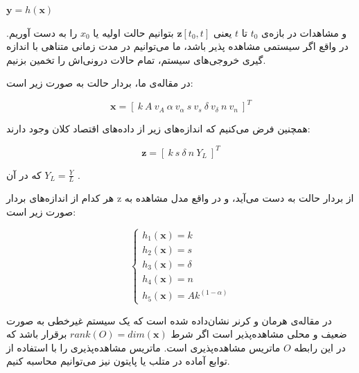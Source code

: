 \documentclass[11pt, fleqn]{article}
\begin{document}
\begin{multicols}{2}
\begin{latin}
$\mathbf{y} = h(\mathbf{x})$
\end{latin}

و مشاهدات در بازه‌ی 
$t_0$
 تا 
 $t$
  یعنی
$\mathbf{z}[t_0, t]$
 بتوانیم حالت اولیه یا 
 $x_0$
 را به دست آوریم. در واقع اگر سیستمی مشاهده‌ پذیر باشد، ما می‌توانیم در مدت زمانی متناهی با اندازه گیری خروجی‌های سیستم، تمام حالات درونی‌اش را تخمین بزنیم.  
 
	در مقاله‌ی ما، بردار حالت به صورت زیر است:

\useshortskip
\begin{LTR}
\begin{equation}
\mathbf{x} = [\ k \ A \ v_A \  \alpha \  v_\alpha \  s \ v_s  \ \delta \  v_\delta \ n \  v_n \ ]^T
\end{equation} 
\end{LTR}

همچنین فرض می‌کنیم که اندازه‌های زیر از داده‌های اقتصاد کلان وجود دارند:

\useshortskip
\begin{LTR}
\begin{equation}
\mathbf{z} = [\ k \ s \ \delta \ n \ Y_L \ ]^T
\end{equation}
\end{LTR}


که در آن 
 $Y_L = \frac{Y}{L}$
  . 

	هر کدام از اندازه‌های بردار z از بردار حالت به دست می‌آید، و در واقع مدل مشاهده به صورت زیر است:

\useshortskip
\begin{LTR}
\begin{equation}
\begin{cases}
h_1(\mathbf{x}) = k \\
 h_2(\mathbf{x}) = s \\
  h_3(\mathbf{x}) = \delta \\
   h_4(\mathbf{x}) = n \\
    h_5(\mathbf{x}) = Ak^{(1-\alpha)} \end{cases}
\end{equation}
\end{LTR}


	در مقاله‌ی هرمان و کرنر 
نشان‌داده شده است که یک سیستم غیرخطی به صورت ضعیف و محلی مشاهده‌پذیر
 است اگر شرط
$rank(O) = dim(\mathbf{x})$
برقرار باشد که در این رابطه
$O$
 ماتریس مشاهده‌پذیری
 است. ماتریس مشاهده‌پذیری را با استفاده از توابع آماده در متلب یا پایتون نیز می‌توانیم محاسبه کنیم.
 

\end{multicols}
\end{document}
